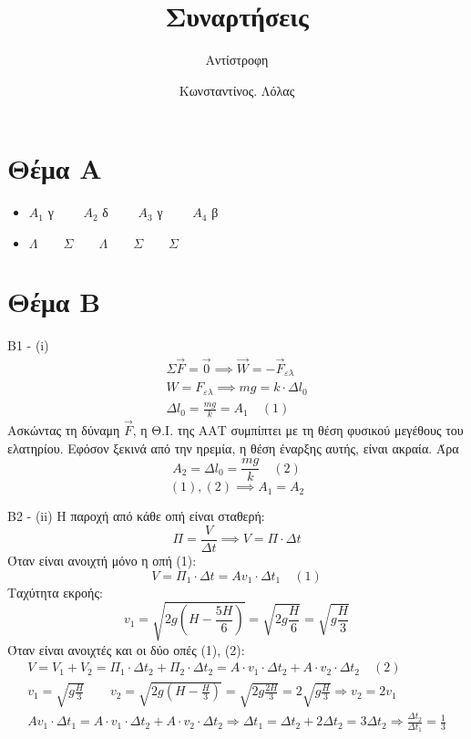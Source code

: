 \documentclass[greek]{beamer}
\title{Συναρτήσεις}
\subtitle{Αντίστροφη}
\author[Λόλας]{Κωνσταντίνος. Λόλας}
\date{}
\begin{document}
\begin{frame}
 \titlepage
\end{frame}

\section{Θέμα Α}
\begin{frame}
 \begin{itemize}
  \item $Α_1$ γ $\qquad Α_2$ δ $\qquad Α_3$ γ $\qquad Α_4$ β \pause
  \item $Λ \qquad Σ \qquad Λ \qquad Σ \qquad Σ$
 \end{itemize}
\end{frame}

\section{Θέμα Β}
\begin{frame}{Β1 - (i)}
 \begin{gather*}
  Σ\overrightarrow{F}=\overrightarrow{0}\implies \overrightarrow{W}=-\overrightarrow{F}_{ελ} \\
  W=F_{ελ}\implies mg=k\cdot Δl_0  \\
  Δl_0=\frac{mg}{k}=Α_1 \quad (1)
 \end{gather*}
 Ασκώντας τη δύναμη $\overrightarrow{F}$, η Θ.Ι. της ΑΑΤ συμπίπτει με τη θέση φυσικού μεγέθους του ελατηρίου. Εφόσον ξεκινά από την ηρεμία, η θέση έναρξης αυτής, είναι ακραία. Άρα $$Α_2=Δl_0=\frac{mg}{k} \quad (2)$$
 $$(1),(2)\implies Α_1=Α_2$$
\end{frame}

\begin{frame}{Β2 - (ii)}
 \begingroup
 \tiny%
 Η παροχή από κάθε οπή είναι σταθερή: $$Π=\frac{V}{Δt}\implies V=Π\cdot Δt$$
 Όταν είναι ανοιχτή μόνο η οπή (1): $$V=Π_1\cdot Δt=Αv_1\cdot Δt_1 \quad (1)$$
 Ταχύτητα εκροής: $$v_1=\sqrt{2g\left(H-\frac{5H}{6}\right)}=\sqrt{2g\frac{H}{6}}=\sqrt{g\frac{H}{3}}$$
 Όταν είναι ανοιχτές και οι δύο οπές (1), (2):
 \begin{gather*}
  V=V_1+V_2=Π_1\cdot Δt_2+Π_2\cdot Δt_2=Α\cdot v_1\cdot Δt_2+Α\cdot v_2\cdot Δt_2 \quad (2) \\
  v_1=\sqrt{g\frac{H}{3}} \qquad v_2=\sqrt{2g\left(H-\frac{H}{3}\right)}=\sqrt{2g\frac{2H}{3}}=2\sqrt{g\frac{H}{3}} \Rightarrow v_2=2v_1 \\
  Αv_1\cdot Δt_1 = Α\cdot v_1\cdot Δt_2+Α\cdot v_2\cdot Δt_2 \Rightarrow Δt_1=Δt_2+2Δt_2=3Δt_2\Rightarrow \frac{Δt_2}{Δt_1}=\frac{1}{3}
 \end{gather*}
 \endgroup
\end{frame}
\end{document}
